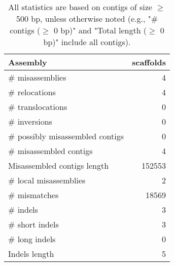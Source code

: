 \documentclass[12pt,a4paper]{article}
\begin{document}
\begin{table}[ht]
\begin{center}
\caption{All statistics are based on contigs of size $\geq$ 500 bp, unless otherwise noted (e.g., "\# contigs ($\geq$ 0 bp)" and "Total length ($\geq$ 0 bp)" include all contigs).}
\begin{tabular}{|l*{1}{|r}|}
\hline
Assembly & scaffolds \\ \hline
\# misassemblies & 4 \\ \hline
\hspace{5mm}\# relocations & 4 \\ \hline
\hspace{5mm}\# translocations & 0 \\ \hline
\hspace{5mm}\# inversions & 0 \\ \hline
\# possibly misassembled contigs & 0 \\ \hline
\# misassembled contigs & 4 \\ \hline
Misassembled contigs length & 152553 \\ \hline
\# local misassemblies & 2 \\ \hline
\# mismatches & 18569 \\ \hline
\# indels & 3 \\ \hline
\hspace{5mm}\# short indels & 3 \\ \hline
\hspace{5mm}\# long indels & 0 \\ \hline
Indels length & 5 \\ \hline
\end{tabular}
\end{center}
\end{table}
\end{document}
